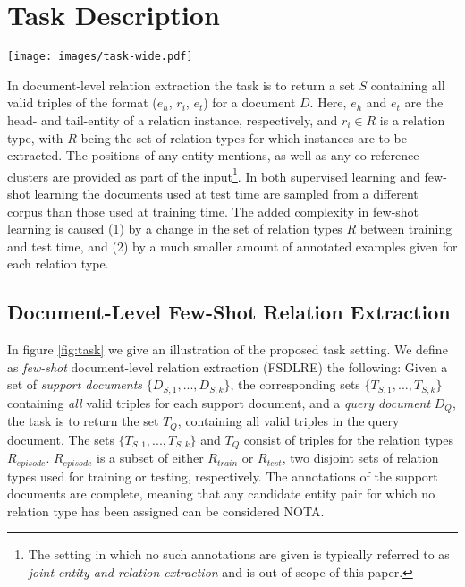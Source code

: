 \documentclass[11pt]{article}
\begin{document}
\section{Task Description}
\label{sec:task}

\begin{figure*}
\centering
    \texttt{[image: images/task-wide.pdf]}
    \caption{\label{fig:task} Illustration of an episode in the Few-Shot Document-Level Relation Extraction setting. Given a support document with annotated relation instances, the task is to return all instances of the same relation types for the query document. During testing a different corpus of documents, as well as a different set of relation types are used than during training.}
\end{figure*}

In document-level relation extraction the task is to return a set $S$ containing all valid triples of the format ($e_{h}$, $r_i$, $e_{t}$) for a document $D$.
Here, $e_{h}$ and $e_{t}$ are the head- and tail-entity of a relation instance, respectively, and
$r_{i} \in R$ is a relation type, with $R$ being the set of relation types for which instances are to be extracted.
The positions of any entity mentions, as well as any co-reference clusters are provided as part of the input\footnote{The setting in which no such annotations are given is typically referred to as \textit{joint entity and relation extraction} and is out of scope of this paper.}.
In both supervised learning and few-shot learning the documents used at test time are sampled from a different corpus than those used at training time.
The added complexity in few-shot learning is caused (1) by a change in the set of relation types $R$ between training and test time, and (2) by a much smaller amount of annotated examples given for each relation type.

\subsection{Document-Level Few-Shot Relation Extraction}
In figure \ref{fig:task} we give an illustration of the proposed task setting.
We define as \textit{few-shot} document-level relation extraction (FSDLRE) the following: 
Given a set of \textit{support documents} $\{D_{S,1}, ..., D_{S,k}\}$, the corresponding sets $\{T_{S,1}, ..., T_{S,k}\}$ containing \textit{all} valid triples for each support document, and a \textit{query document} $D_{Q}$, the task is to return the set $T_{Q}$, containing all valid triples in the query document.
The sets $\{T_{S,1}, ..., T_{S,k}\}$ and $T_{Q}$ consist of triples for the relation types $R_{episode}$. 
$R_{episode}$ is a subset of either $R_{train}$ or $R_{test}$, two disjoint sets of relation types used for training or testing, respectively.
The annotations of the support documents are complete, meaning that any candidate entity pair for which no relation type has been assigned can be considered NOTA.
\end{document}
